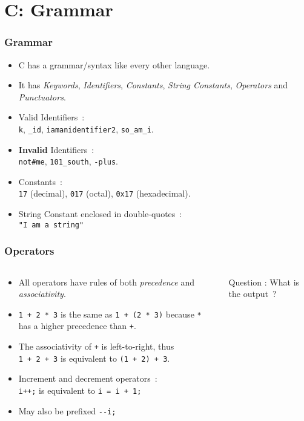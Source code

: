 \section{C: Grammar}

\begin{frame}[fragile]
\frametitle{Grammar}
\begin{itemize}[<+->]
\item  C has a grammar/syntax like every other language.
\item  It has {\it Keywords}, {\it Identifiers}, {\it Constants}, {\it String Constants}, {\it Operators} and {\it Punctuators}.
\item
Valid Identifiers~:\\
\verb+k+,
\verb+_id+,
\verb+iamanidentifier2+,
\verb+so_am_i+.
\item  {\bf Invalid} Identifiers~:\\
\verb+not#me+,
\verb+101_south+,
\verb+-plus+.
\item  Constants~:\\
\verb+17+ (decimal),
\verb+017+ (octal),
\verb+0x17+ (hexadecimal).
\item  String Constant enclosed in double-quotes~:\\
\verb+"I am a string"+
\end{itemize}
\end{frame}

\begin{frame}[fragile]
\frametitle{Operators}

\begin{columns}
\begin{column}{0.5\textwidth}
\begin{itemize}[<+->]
\item All operators have rules of both {\it precedence}
and {\it associativity}.
\item  \verb$1 + 2 * 3$ is the same as
\verb$1 + (2 * 3)$ because \verb$*$ has
a higher precedence than \verb$+$.
\item  The associativity of \verb$+$ is left-to-right, thus\\
\verb$1 + 2 + 3$ is equivalent to
\verb$(1 + 2) + 3$.
\item  Increment and decrement operators~:\\
\verb$i++;$ is equivalent to \verb$i = i + 1;$
\item  May also be prefixed \verb$--i;$
\end{itemize}
\end{column}

\pause
\begin{column}{0.5\textwidth}

{Question : What is the output~?}
\end{column}

\end{columns}
\end{frame}

